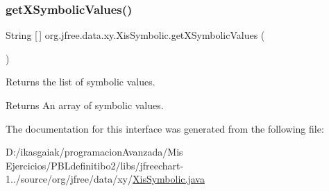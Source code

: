 \subsubsection{\texorpdfstring{get\+X\+Symbolic\+Values()}{getXSymbolicValues()}}
{\footnotesize\ttfamily String \mbox{[}$\,$\mbox{]} org.\+jfree.\+data.\+xy.\+Xis\+Symbolic.\+get\+X\+Symbolic\+Values (\begin{DoxyParamCaption}{ }\end{DoxyParamCaption})}

Returns the list of symbolic values.

\begin{DoxyReturn}{Returns}
An array of symbolic values. 
\end{DoxyReturn}


The documentation for this interface was generated from the following file\+:\begin{DoxyCompactItemize}
\item 
D\+:/ikasgaiak/programacion\+Avanzada/\+Mis Ejercicios/\+P\+B\+Ldefinitibo2/libs/jfreechart-\/1../source/org/jfree/data/xy/\mbox{\hyperlink{_xis_symbolic_8java}{Xis\+Symbolic.\+java}}\end{DoxyCompactItemize}
